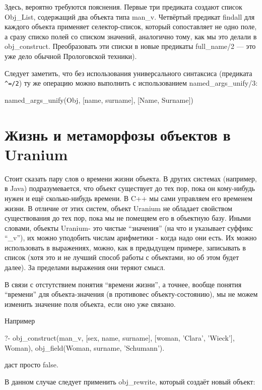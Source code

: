\documentclass[a4paper]{book}
\def\ur{Uranium}
\begin{document}
Здесь, вероятно требуются пояснения.  Первые три предиката
создают список Obj_List, содержащий два объекта типа
man_v. Четвёртый предикат findall для каждого объекта применяет
селектор-список, который сопоставляет не одно поле, а сразу
списко полей со списком значений, аналогично тому, как мы это
делали в obj_construct. Преобразовать эти списки в новые
предикаты full_name/2 --- это уже дело обычной Прологовской
техники).

Следует заметить, что без использования универсального синтаксиса (предиката
\verb|^=/2|) ту же операцию можно выполнить с использованием named_args_unify/3:

\begin{example}{}{}
named_args_unify(Obj, [name, surname], [Name, Surname])
\end{example}


\section{Жизнь и метаморфозы объектов в \ur}
\label{object_life}

Стоит сказать пару слов о времени жизни объекта. В других
системах (например, в Java) подразумевается, что объект
существует до тех пор, пока он кому-нибудь нужен и ещё
сколько-нибудь времени. В C++ мы сами управляем его временем
жизни. В отличие от этих систем, объект \ur{} не обладает
свойством существования до тех пор, пока мы не помещяем его в
объектную базу. Иными словами, объекты \ur - это чистые
``значения'' (на что и указывает суффикс ``_v''), их можно
уподобить числам арифметики - когда надо они есть. Их можно
использовать в выражениях, можно, как в предыдущем примере,
записывать в список (хотя это и не лучший способ работы с
объектами, но об этом будет далее). За пределами выражения они
теряют смысл.

В связи с отстутствием понятия ``времени жизни'', а точнее,
вообще понятия ``времени'' для объекта-значения (в противовес
объекту-состоянию), мы не можем изменить значение поля объекта,
если оно уже связано.

Например

\begin{example}{}{}
?- obj_construct(man_v, [sex, name, surname], 
                        [woman, 'Clara', 'Wieck'], Woman), 
   obj_field(Woman, surname, 'Schumann').
\end{example}

даст просто false.

В данном случае следует применить obj_rewrite, который создаёт новый объект:
\end{document}

